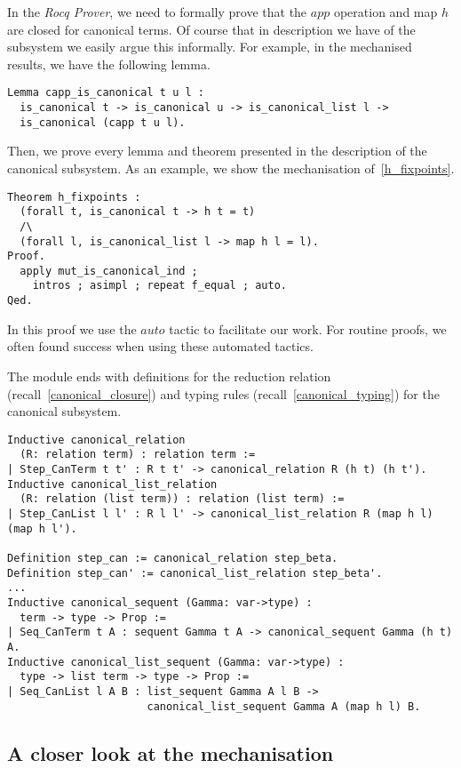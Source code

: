In the \textit{Rocq Prover}, we need to formally prove that the $app$ operation and map $h$ are closed for canonical terms.
Of course that in description we have of the subsystem we easily argue this informally. For example, in the mechanised results, we have the following lemma.
\begin{lstlisting}[language=Coq]
Lemma capp_is_canonical t u l :
  is_canonical t -> is_canonical u -> is_canonical_list l ->
  is_canonical (capp t u l).
\end{lstlisting}

Then, we prove every lemma and theorem presented in the description of the canonical subsystem.
As an example, we show the mechanisation of~\cref{h_fixpoints}.
\begin{lstlisting}[language=Coq]
Theorem h_fixpoints :
  (forall t, is_canonical t -> h t = t)
  /\
  (forall l, is_canonical_list l -> map h l = l).
Proof.
  apply mut_is_canonical_ind ;
    intros ; asimpl ; repeat f_equal ; auto.
Qed.
\end{lstlisting}
In this proof we use the \lst$auto$ tactic to facilitate our work.
For routine proofs, we often found success when using these automated tactics.

The module ends with definitions for the reduction relation (recall~\cref{canonical_closure}) and typing rules (recall~\cref{canonical_typing}) for the canonical subsystem.
\begin{lstlisting}[language=Coq]
Inductive canonical_relation
  (R: relation term) : relation term :=
| Step_CanTerm t t' : R t t' -> canonical_relation R (h t) (h t').
Inductive canonical_list_relation
  (R: relation (list term)) : relation (list term) :=
| Step_CanList l l' : R l l' -> canonical_list_relation R (map h l) (map h l').

Definition step_can := canonical_relation step_beta.
Definition step_can' := canonical_list_relation step_beta'.
...
Inductive canonical_sequent (Gamma: var->type) :
  term -> type -> Prop :=
| Seq_CanTerm t A : sequent Gamma t A -> canonical_sequent Gamma (h t) A.
Inductive canonical_list_sequent (Gamma: var->type) :
  type -> list term -> type -> Prop :=
| Seq_CanList l A B : list_sequent Gamma A l B ->
                      canonical_list_sequent Gamma A (map h l) B.
\end{lstlisting}

\subsection{A closer look at the mechanisation}

